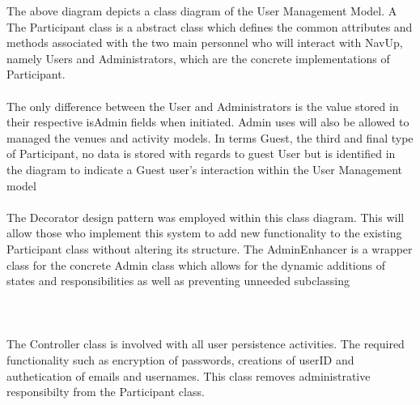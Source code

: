 \documentclass{article}
\begin{document}
		The above diagram depicts a class diagram of the User Management Model. A The Participant class is a abstract class which defines the common attributes and methods associated with the two main personnel who will interact with NavUp, namely Users and Administrators, which are the concrete implementations of Participant.\\\\
		The only difference between the User and Administrators is the value stored in their respective isAdmin fields when initiated. Admin uses will also be allowed to managed the venues and activity models. In terms Guest, the third and final type of Participant, no data is stored with regards to guest User but is identified in the diagram to indicate a Guest user's interaction within the User Management model\\\\
			The Decorator design pattern was employed within this class diagram. This will allow those who implement this system to add new functionality to the existing Participant class without altering its structure. The AdminEnhancer is a wrapper class for the concrete Admin class which allows for the dynamic additions of states and responsibilities as well as preventing unneeded subclassing \\\\
		\\\\
		The Controller class is involved with all user persistence activities. The required functionality such as encryption of passwords, creations of userID and authetication of emails and usernames. This class removes administrative responsibilty from the Participant class. 
		
	
      
\end{document}
